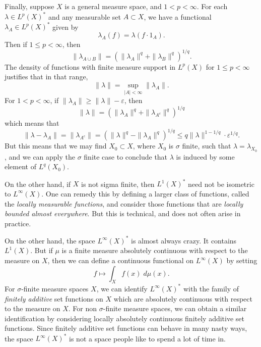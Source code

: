 \begin{example}
    Finally, suppose $X$ is a general measure space, and $1 < p < \infty$. For each $\lambda \in L^p(X)^*$ and any measurable set $A \subset X$, we have a functional $\lambda_A \in L^p(X)^*$ given by
    \[ \lambda_A(f) = \lambda(f \cdot 1_A). \]
    Then if $1 \leq p < \infty$, then
    \[ \| \lambda_{A \cup B} \| = \left( \| \lambda_A \|^q + \| \lambda_B \|^q \right)^{1/q}. \]
    The density of functions with finite measure support in $L^p(X)$ for $1 \leq p < \infty$ justifies that in that range,
    \[ \| \lambda \| = \sup_{|A| < \infty} \| \lambda_A \|. \]
    For $1 < p < \infty$, if $\| \lambda_A \| \geq \| \lambda \| - \varepsilon$, then
    \[ \| \lambda \| = \left( \| \lambda_A \|^q + \| \lambda_{A^c} \|^q \right)^{1/q} \]
    which means that
    \[ \| \lambda - \lambda_A \| = \| \lambda_{A^c} \| = \left( \| \lambda \|^q - \| \lambda_A \|^q \right)^{1/q} \leq q \| \lambda \|^{1-1/q} \cdot \varepsilon^{1/q}. \]
    But this means that we may find $X_0 \subset X$, where $X_0$ is $\sigma$ finite, such that $\lambda = \lambda_{X_0}$, and we can apply the $\sigma$ finite case to conclude that $\lambda$ is induced by some element of $L^q(X_0)$.

    On the other hand, if $X$ is not sigma finite, then $L^1(X)^*$ need not be isometric to $L^\infty(X)$. One can remedy this by defining a larger class of functions, called the \emph{locally measurable functions}, and consider those functions that are \emph{locally bounded almost everywhere}. But this is technical, and does not often arise in practice.

    On the other hand, the space $L^\infty(X)^*$ is almost always crazy. It contains $L^1(X)$. But if $\mu$ is a finite measure absolutely continuous with respect to the measure on $X$, then we can define a continuous functional on $L^\infty(X)$ by setting
    \[ f \mapsto \int_X f(x)\; d\mu(x). \]
    For $\sigma$-finite measure spaces $X$, we can identify $L^\infty(X)^*$ with the family of \emph{finitely additive} set functions on $X$ which are absolutely continuous with respect to the measure on $X$. For non $\sigma$-finite measure spaces, we can obtain a similar identification by considering locally absolutely continuous finitely additive set functions. Since finitely additive set functions can behave in many nasty ways, the space $L^\infty(X)^*$ is not a space people like to spend a lot of time in.
\end{example}

